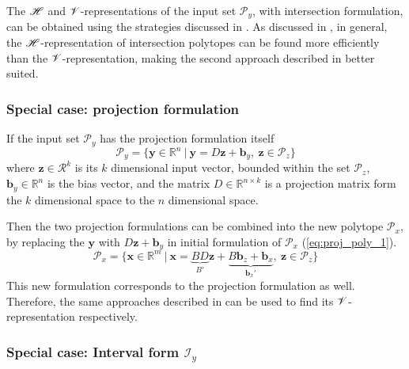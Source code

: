 The $\mathscr{H}$ and $\mathscr{V}$-representations of the input set $\mathcal{P}_y$, with intersection formulation, can be obtained using the strategies discussed in . As discussed in , in general, the $\mathscr{H}$-representation of intersection polytopes can be found more efficiently than the $\mathscr{V}$-representation, making the second approach described in  better suited.


\subsubsection*{Special case: projection formulation} 
If the input set $\mathcal{P}_y$ has the projection formulation itself
\begin{equation}
    \mathcal{P}_y=\{\bm{y}\in  \mathbb{R}^n~|~ \bm{y}=D\bm{z} + \bm{b}_y, ~ \bm{z} \in \mathcal{P}_z \}
\end{equation}
where $\bm{z}\in\mathcal{R}^k$ is its $k$ dimensional input vector, bounded within the set $\mathcal{P}_z$, $\bm{b}_y\in\mathbb{R}^n$ is the bias vector, and the matrix $D\in \mathbb{R}^{n\times k}$ is a projection matrix form the $k$ dimensional space to the $n$ dimensional space.

Then the two projection formulations can be combined into the new polytope $\mathcal{P}_x$, by replacing the $\bm{y}$ with $D\bm{z} + \bm{b}_y$ in initial formulation of $\mathcal{P}_x$ (\ref{eq:proj_poly_1}).
\begin{equation}
    \mathcal{P}_x=\{\bm{x}\in  \mathbb{R}^m~|~ \bm{x}=\underbrace{BD}_{B'}\bm{z} + \underbrace{B\bm{b}_z + \bm{b}_x}_{\bm{b}_x'}, ~ \bm{z} \in \mathcal{P}_z \}
\end{equation}
This new formulation corresponds to the projection formulation as well. Therefore, the same approaches described in  can be used to find its $\mathscr{V}$-representation respectively.

\subsubsection*{Special case: Interval form $\mathcal{I}_y$} 


